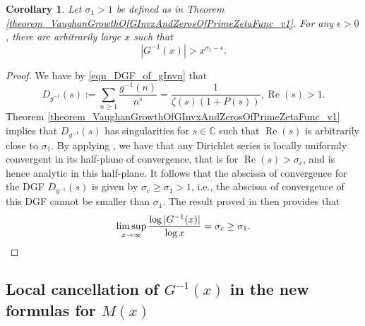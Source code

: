 \documentclass[11pt,reqno,a4letter]{article}
\numberwithin{figure}{section}
\numberwithin{table}{section}
\theoremstyle{plain}
\newtheorem{cor}[theorem]{Corollary}
\numberwithin{theorem}{section}
\theoremstyle{definition}
\renewcommand{\Re}{\operatorname{Re}}
\begin{document}
\begin{cor}
\label{cor_Vaughan_LimSupLowerBounds_On_GInvx_AtLarge_x_v2} 
Let $\sigma_1 > 1$ be defined as in 
Theorem \ref{theorem_VaughanGrowthOfGInvxAndZerosOfPrimeZetaFunc_v1}. 
For any $\epsilon > 0$, there are arbitrarily large $x$ such that 
\[
|G^{-1}(x)| > x^{\sigma_1-\epsilon}. 
\]
\end{cor}
\begin{proof}
We have by \eqref{eqn_DGF_of_gInvn} that 
\[
D_{g^{-1}}(s) := \sum_{n \geq 1} \frac{g^{-1}(n)}{n^s} = \frac{1}{\zeta(s)(1+P(s))}, \Re(s) > 1. 
\]
Theorem \ref{theorem_VaughanGrowthOfGInvxAndZerosOfPrimeZetaFunc_v1} implies that 
$D_{g^{-1}}(s)$ has singularities for $s \in \mathbb{C}$ such that 
$\Re(s)$ is arbitrarily close to $\sigma_1$. 
By applying \cite[Cor.~1.2; \S 1.2]{MV}, we have that any Dirichlet series 
is locally uniformly convergent in its half-plane of convergence, 
that is for $\Re(s) > \sigma_c$, and is hence analytic in this half-plane. 
It follows that the abscissa of convergence for the DGF 
$D_{g^{-1}}(s)$ is given by $\sigma_c \geq \sigma_1 > 1$, i.e., 
the abscissa of convergence of this DGF cannot be smaller than $\sigma_1$. 
The result proved in \cite[Thm.~1.3; \S 1.2]{MV} then provides that 
\[
\limsup_{x \rightarrow \infty} \frac{\log |G^{-1}(x)|}{\log x} = \sigma_c \geq \sigma_1. 
     \qedhere 
\]
\end{proof}

\subsection{Local cancellation of $G^{-1}(x)$ in the new formulas for $M(x)$} 
\label{subSection_LocalCancellationOfGInvx} 
\end{document}
